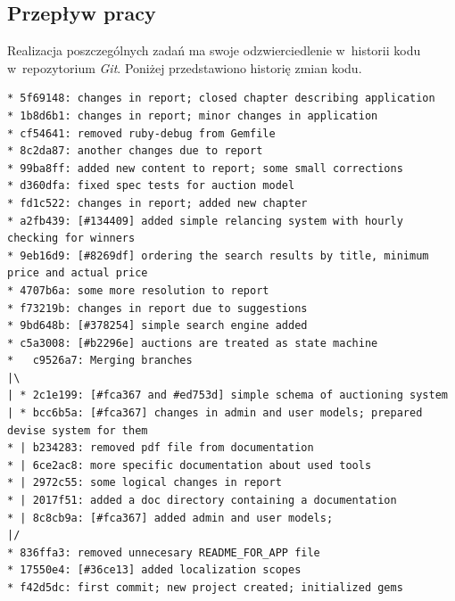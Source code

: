 \subsection{Przepływ pracy}

Realizacja poszczególnych zadań ma swoje odzwierciedlenie w~historii kodu w~repozytorium \textit{Git}. Poniżej przedstawiono historię zmian kodu.

\begin{verbatim}
* 5f69148: changes in report; closed chapter describing application
* 1b8d6b1: changes in report; minor changes in application
* cf54641: removed ruby-debug from Gemfile
* 8c2da87: another changes due to report
* 99ba8ff: added new content to report; some small corrections
* d360dfa: fixed spec tests for auction model
* fd1c522: changes in report; added new chapter
* a2fb439: [#134409] added simple relancing system with hourly checking for winners
* 9eb16d9: [#8269df] ordering the search results by title, minimum price and actual price
* 4707b6a: some more resolution to report
* f73219b: changes in report due to suggestions
* 9bd648b: [#378254] simple search engine added
* c5a3008: [#b2296e] auctions are treated as state machine
*   c9526a7: Merging branches
|\
| * 2c1e199: [#fca367 and #ed753d] simple schema of auctioning system
| * bcc6b5a: [#fca367] changes in admin and user models; prepared devise system for them
* | b234283: removed pdf file from documentation
* | 6ce2ac8: more specific documentation about used tools
* | 2972c55: some logical changes in report
* | 2017f51: added a doc directory containing a documentation
* | 8c8cb9a: [#fca367] added admin and user models;
|/
* 836ffa3: removed unnecesary README_FOR_APP file
* 17550e4: [#36ce13] added localization scopes
* f42d5dc: first commit; new project created; initialized gems
\end{verbatim}
